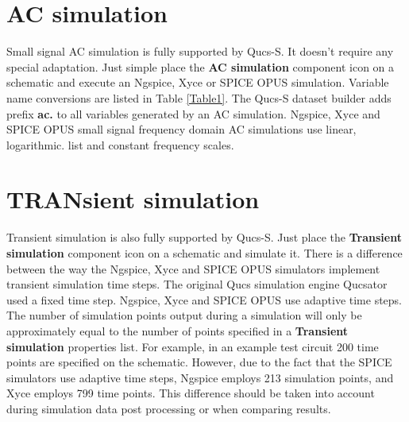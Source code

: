 \documentclass[10pt, a4paper]{report}
\begin{document}
\section{AC simulation}
Small signal AC simulation is fully supported by Qucs-S. It doesn't require any special adaptation. Just simple place the \textbf{AC simulation} component icon on a  schematic and execute an Ngspice, Xyce or SPICE OPUS simulation. Variable name conversions are listed in Table \ref{Table1}. The Qucs-S dataset builder adds prefix \textbf{ac.} to all variables generated by an AC simulation. Ngspice, Xyce and SPICE OPUS small signal frequency domain AC simulations use linear, logarithmic. list and constant frequency scales. 

\section{TRANsient simulation}
Transient simulation is also fully supported by Qucs-S. Just place the \textbf{Transient simulation} component icon on a schematic and simulate it.  There is a difference between the way the Ngspice, Xyce and SPICE OPUS simulators implement transient simulation time steps. The original Qucs simulation engine Qucsator used a fixed time step. Ngspice, Xyce and SPICE OPUS use adaptive time steps. The number of simulation points output during a simulation will only be approximately equal to the number of points specified in a \textbf{Transient simulation} properties list.  For example, in an example test circuit 200 time points are specified on the schematic. However, due to the fact that the SPICE simulators use adaptive time steps, Ngspice employs 213 simulation points, and Xyce employs 799 time points. This difference should be taken into account during simulation data post processing or when comparing results. 
\end{document}

